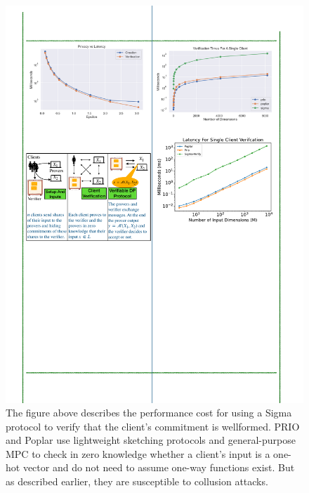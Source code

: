  \begin{figure}[t]
     \centering    
     \includegraphics[scale=0.9]{pngs/verification_times.pdf}
     \caption{The figure above describes the performance cost for using a Sigma protocol to verify that the client's commitment is wellformed. PRIO and Poplar use lightweight sketching protocols and general-purpose MPC to check in zero knowledge whether a client's input is a one-hot vector and do not need to assume one-way functions exist. But as described earlier, they are susceptible to collusion attacks.}
     \label{fig:client_verification}
 \end{figure}

